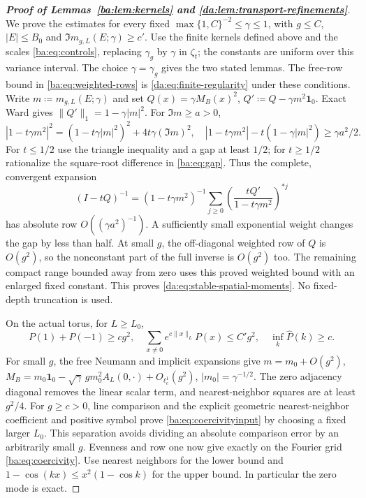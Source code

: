 \documentclass[11pt]{article}
\numberwithin{equation}{section}
\theoremstyle{remark}
\begin{document}
\begin{proof}[\textbf{Proof of Lemmas~\ref{ba:lem:kernels} and \ref{da:lem:transport-refinements}}]
We prove the estimates for every fixed
$\max\{1,C\}^{-2}\le\gamma\le1$, with $g\le C$, $|E|\le B_0$ and
$\Im m_{g,L}(E;\gamma)\ge c'$. Use the finite kernels defined above
and the scales \eqref{ba:eq:controls}, replacing $\gamma_g$ by $\gamma$
in $\zeta_t$; the constants are uniform over this variance interval.
The choice $\gamma=\gamma_g$ gives the two stated lemmas.
The free-row bound in \eqref{ba:eq:weighted-rows} is
\eqref{da:eq:finite-regularity} under these conditions.
Write $m\coloneqq m_{g,L}(E;\gamma)$ and set $Q(x)=\gamma M_B(x)^2$, $Q'\coloneqq Q-\gamma m^2\mathbf1_0$. Exact Ward gives
$\|Q'\|_1=1-\gamma|m|^2$. For $\Im m\ge a>0$,
\begin{equation}\label{ba:eq:gap}
 |1-t\gamma m^2|^2=(1-t\gamma|m|^2)^2+4t\gamma(\Im m)^2,
 \quad |1-t\gamma m^2|-t(1-\gamma|m|^2)\ge\gamma a^2/2.
\end{equation}
For $t\le1/2$ use the triangle inequality and a gap at least $1/2$;
for $t\ge1/2$ rationalize the square-root difference in
\eqref{ba:eq:gap}. Thus the complete, convergent expansion
\begin{equation}\label{ba:eq:stableinverse}
 (I-tQ)^{-1}=(1-t\gamma m^2)^{-1}
       \sum_{j\ge0}\left(\frac{tQ'}{1-t\gamma m^2}\right)^{*j}
\end{equation}
has absolute row $O((\gamma a^2)^{-1})$. A sufficiently small exponential
weight changes the gap by less than half. At small $g$, the
off-diagonal weighted row of $Q$ is $O(g^2)$, so the nonconstant
part of the full inverse is $O(g^2)$ too. The remaining compact
range bounded away from zero uses this proved weighted bound
with an enlarged fixed constant. This proves
\eqref{da:eq:stable-spatial-moments}. No fixed-depth truncation is used.

On the actual torus, for $L\ge L_0$,
\begin{equation}\label{ba:eq:coercivityinput}
 P(1)+P(-1)\ge cg^2,\quad
 \sum_{x\ne0}e^{c\|x\|_L}P(x)\le C'g^2,\quad
 \inf_k\widehat P(k)\ge c.
\end{equation}
For small $g$, the free Neumann and implicit expansions give
$m=m_0+O(g^2)$,
$M_B=m_0\mathbf1_0-\sqrt\gamma\,gm_0^2A_L(0,\cdot)+O_{\ell^1_c}(g^2)$,
$|m_0|=\gamma^{-1/2}$. The zero adjacency diagonal removes the linear scalar
term, and nearest-neighbor squares are at least $g^2/4$.
For $g\ge c>0$, line comparison and the explicit geometric
nearest-neighbor coefficient and positive symbol prove
\eqref{ba:eq:coercivityinput} by choosing a fixed larger $L_0$.
This separation avoids dividing an absolute comparison error by
an arbitrarily small $g$.
Evenness and row one now give exactly on the Fourier grid
\eqref{ba:eq:coercivity}.
Use nearest neighbors for the lower bound and
$1-\cos(kx)\le x^2(1-\cos k)$ for the upper bound. In particular
the zero mode is exact.


\end{proof}
\end{document}
